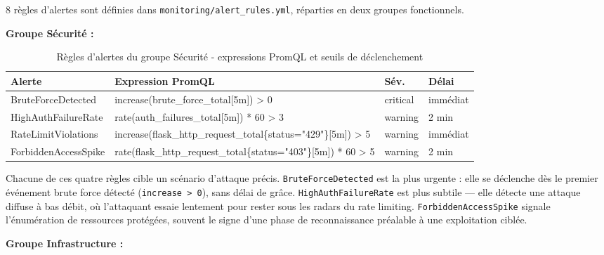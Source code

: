 \documentclass[12pt, a4paper]{report}
\begin{document}
8 règles d'alertes sont définies dans \texttt{monitoring/alert\_rules.yml}, réparties en deux groupes fonctionnels.

\textbf{Groupe Sécurité :}

\begin{table}[H]
  \centering
  \caption{Règles d'alertes du groupe Sécurité - expressions PromQL et seuils de déclenchement}
  \small
  \begin{tabularx}{\textwidth}{@{}p{3.5cm}>{\ttfamily\raggedright\arraybackslash}Xp{1.5cm}p{1.5cm}@{}}
    \toprule
    \textbf{Alerte} & \normalfont\textbf{Expression PromQL} & \textbf{Sév.} & \textbf{Délai} \\
    \midrule
    BruteForceDetected   & increase(brute\_force\_total[5m]) > 0                                                    & critical & immédiat \\
    HighAuthFailureRate  & rate(auth\_failures\_total[5m]) * 60 > 3                                                 & warning  & 2 min \\
    RateLimitViolations  & increase(flask\_http\_request\_total\newline\{status="429"\}[5m]) > 5                    & warning  & immédiat \\
    ForbiddenAccessSpike & rate(flask\_http\_request\_total\newline\{status="403"\}[5m]) * 60 > 5                  & warning  & 2 min \\
    \bottomrule
  \end{tabularx}
\end{table}

\medskip
Chacune de ces quatre règles cible un scénario d'attaque précis. \texttt{BruteForceDetected} est la plus urgente : elle se déclenche dès le premier événement brute force détecté (\texttt{increase > 0}), sans délai de grâce. \texttt{HighAuthFailureRate} est plus subtile — elle détecte une attaque diffuse à bas débit, où l'attaquant essaie lentement pour rester sous les radars du rate limiting. \texttt{ForbiddenAccessSpike} signale l'énumération de ressources protégées, souvent le signe d'une phase de reconnaissance préalable à une exploitation ciblée.

\textbf{Groupe Infrastructure :}
\end{document}
